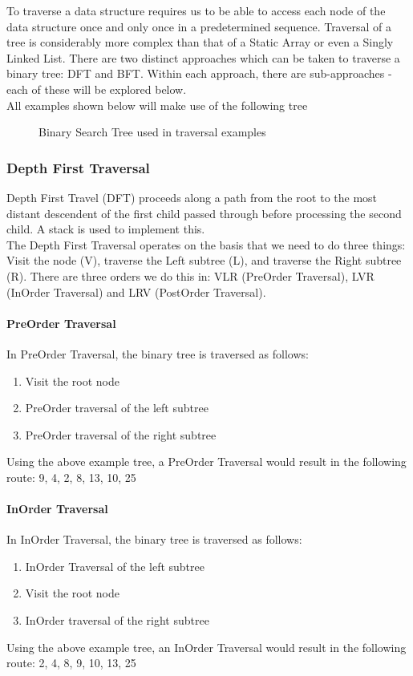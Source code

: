 To traverse a data structure requires us to be able to access each node of the data structure once and only once in a predetermined sequence. Traversal of a tree is considerably more complex than that of a Static Array or even a Singly Linked List. There are two distinct approaches which can be taken to traverse a binary tree: DFT and BFT. Within each approach, there are sub-approaches - each of these will be explored below.\\

All examples shown below will make use of the following tree
\begin{figure}[H]
    \centering
    
    \caption{Binary Search Tree used in traversal examples}    
\end{figure}

\subsubsection{Depth First Traversal}
Depth First Travel (DFT) proceeds along a path from the root to the most distant descendent of the first child passed through before processing the second child. A stack is used to implement this.\\

The Depth First Traversal operates on the basis that we need to do three things: Visit the node (V), traverse the Left subtree (L), and traverse the Right subtree (R). There are three orders we do this in: VLR (PreOrder Traversal), LVR (InOrder Traversal) and LRV (PostOrder Traversal). 

\paragraph{PreOrder Traversal}
In PreOrder Traversal, the binary tree is traversed as follows:
\begin{enumerate}
    \item Visit the root node
    \item PreOrder traversal of the left subtree
    \item PreOrder traversal of the right subtree
\end{enumerate}
Using the above example tree, a PreOrder Traversal would result in the following route: 9, 4, 2, 8, 13, 10, 25

\paragraph{InOrder Traversal}
In InOrder Traversal, the binary tree is traversed as follows:
\begin{enumerate}
    \item InOrder Traversal of the left subtree
    \item Visit the root node
    \item InOrder traversal of the right subtree
\end{enumerate}
Using the above example tree, an InOrder Traversal would result in the following route: 2, 4, 8, 9, 10, 13, 25

